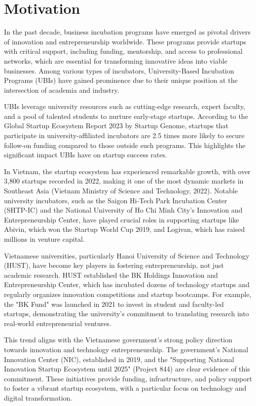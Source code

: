 \documentclass[../Main.tex]{subfiles}
\begin{document}
	\section{Motivation}
	\label{section:1.1_Motivation}
	In the past decade, business incubation programs have emerged as pivotal drivers of innovation and entrepreneurship worldwide. These programs provide startups with critical support, including funding, mentorship, and access to professional networks, which are essential for transforming innovative ideas into viable businesses. Among various types of incubators, University-Based Incubation Programs (UBIs) have gained prominence due to their unique position at the intersection of academia and industry.

	UBIs leverage university resources such as cutting-edge research, expert faculty, and a pool of talented students to nurture early-stage startups. According to the Global Startup Ecosystem Report 2023 by Startup Genome, startups that participate in university-affiliated incubators are 2.5 times more likely to secure follow-on funding compared to those outside such programs. This highlights the significant impact UBIs have on startup success rates.

	In Vietnam, the startup ecosystem has experienced remarkable growth, with over 3,800 startups recorded in 2022, making it one of the most dynamic markets in Southeast Asia (Vietnam Ministry of Science and Technology, 2022). Notable university incubators, such as the Saigon Hi-Tech Park Incubation Center (SHTP-IC) and the National University of Ho Chi Minh City's Innovation and Entrepreneurship Center, have played crucial roles in supporting startups like Abivin, which won the Startup World Cup 2019, and Logivan, which has raised millions in venture capital.

	Vietnamese universities, particularly Hanoi University of Science and Technology (HUST), have become key players in fostering entrepreneurship, not just academic research. HUST established the BK Holdings Innovation and Entrepreneurship Center, which has incubated dozens of technology startups and regularly organizes innovation competitions and startup bootcamps. For example, the "BK Fund" was launched in 2021 to invest in student and faculty-led startups, demonstrating the university's commitment to translating research into real-world entrepreneurial ventures.

	This trend aligns with the Vietnamese government's strong policy direction towards innovation and technology entrepreneurship. The government's National Innovation Center (NIC), established in 2019, and the "Supporting National Innovation Startup Ecosystem until 2025" (Project 844) are clear evidence of this commitment. These initiatives provide funding, infrastructure, and policy support to foster a vibrant startup ecosystem, with a particular focus on technology and digital transformation.
\end{document}
